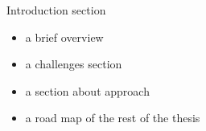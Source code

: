 
{\color{orange} Introduction section}

\begin{itemize}
    \item a brief overview
    \item a challenges section
    \item a section about approach
    \item a road map of the rest of the thesis
\end{itemize}
